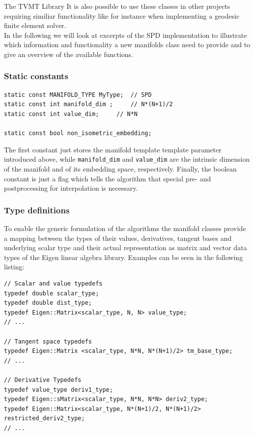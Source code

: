 \begin{chapter}{The TVMT Library}
It is also possible to use these classes in other projects requiring similiar functionality like 
for instance when implementing a geodesic finite element solver.\\

In the following we will look at excerpts of the SPD implementation to illustrate which information and functionality a new manifolds class need to provide and to give an overview
of the available functions.

\subsubsection{Static constants} %
\label{ssub:Static constants}
\cppinline
\begin{lstlisting}
static const MANIFOLD_TYPE MyType;	// SPD
static const int manifold_dim ;		// N*(N+1)/2
static const int value_dim;		// N*N

static const bool non_isometric_embedding;
\end{lstlisting}
The first constant just stores the manifold template template parameter introduced above, while \texttt{manifold\_dim} and \texttt{value\_dim} are the intrinsic dimension of the manifold
and of its embedding space, respectively. Finally, the boolean constant is just a flag which tells the algorithm that special pre- and postprocessing for interpolation is necessary.\\

\subsubsection{Type definitions} %
\label{ssub:Type definitions}
To enable the generic formulation of the algorithms the manifold classes provide a mapping between the types of their values, derivatives, tangent bases and underlying scalar type and their 
actual representation as matrix and vector data types of the Eigen linear algebra library. Examples can be seen in the following listing:

\cppinline
\begin{lstlisting}
// Scalar and value typedefs
typedef double scalar_type;
typedef double dist_type;
typedef Eigen::Matrix<scalar_type, N, N> value_type;
// ...

// Tangent space typedefs
typedef Eigen::Matrix <scalar_type, N*N, N*(N+1)/2> tm_base_type;
// ...

// Derivative Typedefs
typedef value_type deriv1_type;
typedef Eigen::sMatrix<scalar_type, N*N, N*N> deriv2_type;
typedef Eigen::Matrix<scalar_type, N*(N+1)/2, N*(N+1)/2> restricted_deriv2_type;
// ...
\end{lstlisting}


\end{chapter}
